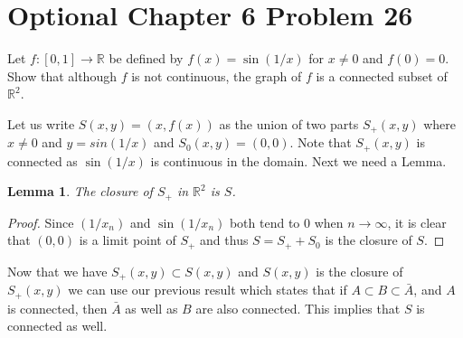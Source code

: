 \documentclass{article}
\newtheorem{lem}{Lemma}
\newtheorem{proof}{Proof}
\def\to{\rightarrow}
\def\RR{\mathbb R}
\begin{document}
\section{Optional Chapter 6 Problem 26}
Let $f:[0,1]\to\RR$ be defined by $f(x)=\sin(1/x)$ for $x\ne 0$ and
$f(0)=0$. Show that although $f$ is not continuous, the graph of $f$
is a connected subset of $\RR^2$.

Let us write $S(x,y)=(x,f(x))$ as the union of two parts $S_+(x,y)$
where $x\ne 0$ and $y=sin(1/x)$ and $S_0(x,y)=(0,0)$.
Note that $S_+(x,y)$ is connected as $\sin(1/x)$ is continuous in
the domain.
 Next we need a Lemma.
\begin{lem} The closure of $S_+$ in $\RR^2$ is $S$.
\end{lem}
\begin{proof}
Since $(1/x_n)$ and $\sin(1/x_n)$ both tend to 0 when $n\to\infty$,
it is clear that $(0,0)$ is a limit point of $S_+$ and thus $S=S_++S_0$
is the closure of $S$.
\end{proof}

Now that we have $S_+(x,y)\subset S(x,y)$ and $S(x,y)$ is the closure
of $S_+(x,y)$ we can use our previous result which states that if
$A\subset B\subset\bar{A}$, and $A$ is connected, then $\bar{A}$
as well as $B$ are also connected. This implies that $S$ is connected
as well.
\end{document}
